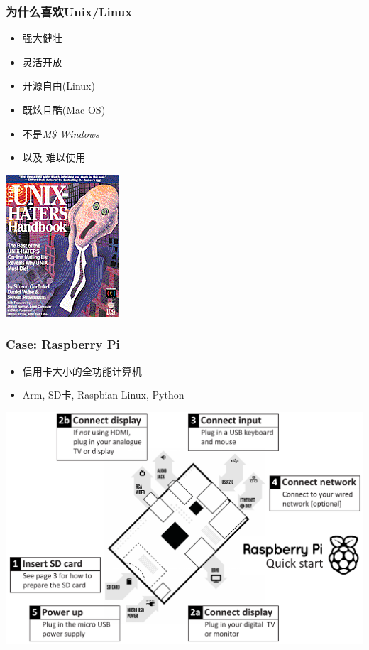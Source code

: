 \documentclass[compress]{beamer}
\begin{document}
\begin{frame}
\frametitle{为什么喜欢Unix/Linux}

\begin{minipage}[b]{0.5\hsize}
\begin{itemize}
\item 强大健壮
\item 灵活开放
\item 开源自由(Linux)
\item 既炫且酷(Mac OS)
\item 不是\emph{M\$ Windows}
\item 以及 \pause 难以使用
\end{itemize}
\end{minipage}%
\begin{minipage}[b]{0.5\hsize}
\hfill\includegraphics[width=0.5\hsize]{uhh.png}
\end{minipage}
\end{frame}

\begin{frame}
\frametitle{Case: Raspberry Pi}
\begin{itemize}
    \item 信用卡大小的全功能计算机
    \item Arm, SD卡, Raspbian Linux, Python
\end{itemize}
\includegraphics[width=0.8\hsize]{raspberrypi-1.pdf}
\end{frame}
\end{document}
